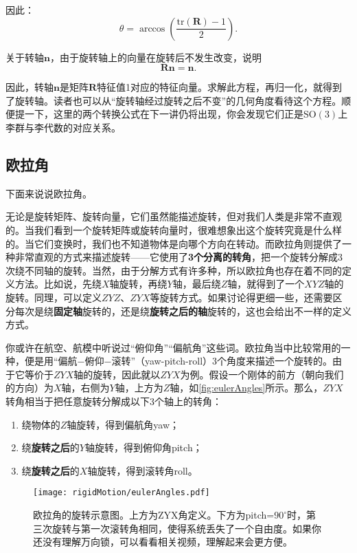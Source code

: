 因此：
\begin{equation}
\label{eq:R2theta}
\theta = \arccos ( \frac{\mathrm{tr}(\bm{R}) - 1}{2}  ) .
\end{equation}

关于转轴$\bm{n}$，由于旋转轴上的向量在旋转后不发生改变，说明
\[
\bm{R} \bm{n} = \bm{n}.
\]

因此，转轴$\bm{n}$是矩阵$\bm{R}$特征值1对应的特征向量。求解此方程，再归一化，就得到了旋转轴。读者也可以从“旋转轴经过旋转之后不变”的几何角度看待这个方程。顺便提一下，这里的两个转换公式在下一讲仍将出现，你会发现它们正是$\mathrm{SO}(3)$上李群与李代数的对应关系。

\subsection{欧拉角}
下面来说说欧拉角。

无论是旋转矩阵、旋转向量，它们虽然能描述旋转，但对我们人类是非常不直观的。当我们看到一个旋转矩阵或旋转向量时，很难想象出这个旋转究竟是什么样的。当它们变换时，我们也不知道物体是向哪个方向在转动。而欧拉角则提供了一种非常直观的方式来描述旋转——它使用了\textbf{3个分离的转角}，把一个旋转分解成3次绕不同轴的旋转。当然，由于分解方式有许多种，所以欧拉角也存在着不同的定义方法。比如说，先绕$X$轴旋转，再绕$Y$轴，最后绕$Z$轴，就得到了一个$XYZ$轴的旋转。同理，可以定义$ZYZ$、$ZYX$等旋转方式。如果讨论得更细一些，还需要区分每次是绕\textbf{固定轴}旋转的，还是绕\textbf{旋转之后的轴}旋转的，这也会给出不一样的定义方式。

你或许在航空、航模中听说过“俯仰角”“偏航角”这些词。欧拉角当中比较常用的一种，便是用“偏航−俯仰−滚转”（yaw-pitch-roll）3个角度来描述一个旋转的。由于它等价于$ZYX$轴的旋转，因此就以$ZYX$为例。假设一个刚体的前方（朝向我们的方向）为$X$轴，右侧为$Y$轴，上方为$Z$轴，如\autoref{fig:eulerAngles}所示。那么，$ZYX$转角相当于把任意旋转分解成以下3个轴上的转角：

\begin{enumerate}
	\item 绕物体的$Z$轴旋转，得到偏航角yaw；
	\item 绕\textbf{旋转之后}的$Y$轴旋转，得到俯仰角pitch；
	\item 绕\textbf{旋转之后}的$X$轴旋转，得到滚转角roll。
\end{enumerate}

\begin{figure}[!t]
	\centering
	\texttt{[image: rigidMotion/eulerAngles.pdf]}
	\caption{欧拉角的旋转示意图。上方为ZYX角定义。下方为pitch=$90^\circ$时，第三次旋转与第一次滚转角相同，使得系统丢失了一个自由度。如果你还没有理解万向锁，可以看看相关视频，理解起来会更方便。}
	\label{fig:eulerAngles}
\end{figure}

